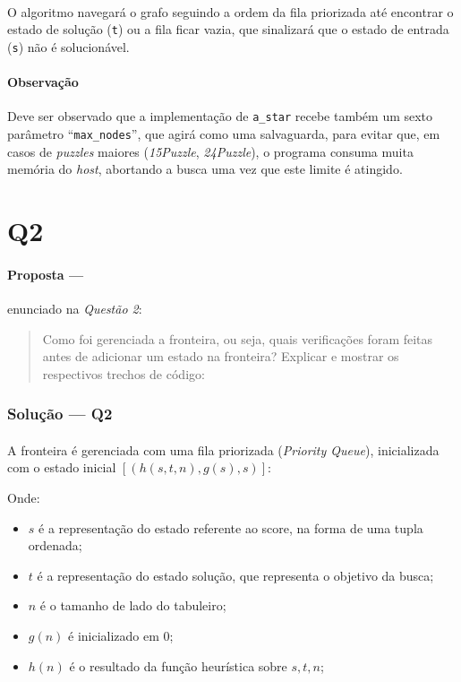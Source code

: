 \documentclass[12pt]{article}
\begin{document}
\paragraph{}
O algoritmo navegará o grafo seguindo a ordem da fila priorizada até encontrar o estado de solução (\texttt{t}) ou a
fila ficar vazia, que sinalizará que o estado de entrada (\texttt{s}) não é solucionável.

\paragraph{Observação}
Deve ser observado que a implementação de \texttt{a\_star} recebe também um sexto parâmetro ``\texttt{max\_nodes}'', que
agirá como uma salvaguarda, para evitar que, em casos de \textit{puzzles} maiores (\textit{15Puzzle},
\textit{24Puzzle}), o programa consuma muita memória do \textit{host}, abortando a busca uma vez que este limite é
atingido.

\section{Q2}

\paragraph{Proposta ---} enunciado na \textit{Questão 2}:

\begin{quote}
Como foi gerenciada a fronteira, ou seja, quais verificações foram feitas antes de adicionar um estado na fronteira? Explicar e mostrar os respectivos trechos de código:
\end{quote}

\subsubsection{Solução --- \textbf{Q2}}

\paragraph{}
A fronteira é gerenciada com uma fila priorizada (\textit{Priority Queue}), inicializada com o estado inicial $\left[ \left( h(s, t, n), g(s), s \right) \right]$:

Onde:
\begin{itemize}
  \item $s$ é a representação do estado referente ao score, na forma de uma tupla ordenada;
  \item $t$ é a representação do estado solução, que representa o objetivo da busca;
  \item $n$ é o tamanho de lado do tabuleiro;
  \item $g(n)$ é inicializado em 0;
  \item $h(n)$ é o resultado da função heurística sobre $s, t, n$;
\end{itemize}
\end{document}
